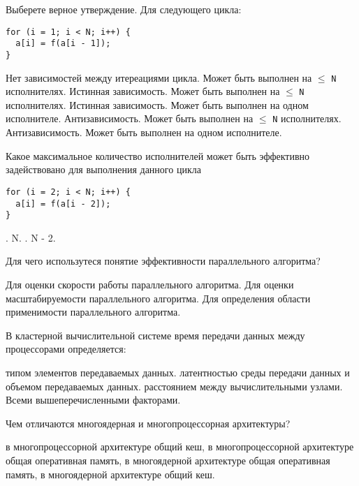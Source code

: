 \documentclass[a4paper, 12pt, addpoints]{exam}
\begin{document}
\begin{questions}
\question[1]
Выберете верное утверждение. Для следующего цикла:
\begin{lstlisting}
for (i = 1; i < N; i++) {
  a[i] = f(a[i - 1]);
}
\end{lstlisting}
\begin{choices}
    \choice Нет зависимостей между итереациями цикла. Может быть выполнен на $\leq$ \texttt{N} исполнителях.
    \choice Истинная зависимость. Может быть выполнен на $\leq$ \texttt{N} исполнителях.
    \correctchoice Истинная зависимость. Может быть выполнен на одном исполнителе.
    \choice Антизависимость. Может быть выполнен на $\leq$ \texttt{N} исполнителях.
    \choice Антизависимость. Может быть выполнен на одном исполнителе.
\end{choices}

\question[1] Какое максимальное количество исполнителей может быть эффективно задействовано для выполнения данного цикла
\begin{lstlisting}
for (i = 2; i < N; i++) {
  a[i] = f(a[i - 2]);
}
\end{lstlisting}
\begin{choices}
    .
    \choice N.
    .
    \choice N - 2.
\end{choices}

\question[1] Для чего использутеся понятие эффективности параллельного алгоритма?
\begin{choices}
    \choice Для оценки скорости работы параллельного алгоритма.
    \correctchoice Для оценки масштабируемости параллельного алгоритма.
    \choice Для определения области применимости параллельного алгоритма.
\end{choices}

\question[1] В кластерной вычислительной системе время передачи данных между процессорами определяется:
\begin{choices}
    \choice типом элементов передаваемых данных.
    \correctchoice латентностью среды передачи данных и объемом передаваемых данных.
    \choice расстоянием между вычислительными узлами.
    \choice Всеми вышеперечисленными факторами.
\end{choices}

\question[1] Чем отличаются многоядерная и многопроцессорная архитектуры?
\begin{choices}
    \choice в многопроцессорной архитектуре общий кеш,
    \choice в многопроцессорной архитектуре общая оперативная память,
    \choice в многоядерной архитектуре общая оперативная память,
    \correctchoice в многоядерной архитектуре общий кеш.
\end{choices}


\end{questions}
\end{document}
